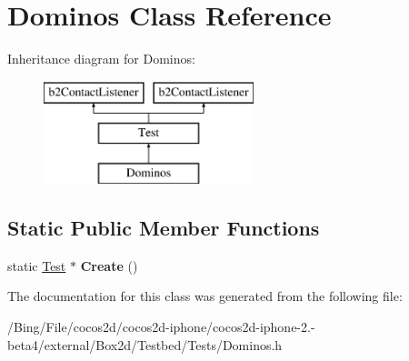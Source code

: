 \hypertarget{class_dominos}{\section{Dominos Class Reference}
\label{class_dominos}
}
Inheritance diagram for Dominos\-:\begin{figure}[H]
\begin{center}
\leavevmode
\includegraphics[height=3.000000cm]{class_dominos}
\end{center}
\end{figure}
\subsection*{Static Public Member Functions}
\begin{DoxyCompactItemize}
\item 
\hypertarget{class_dominos_a804c1c471f0eff8529a84948120f0d1a}{static \hyperlink{class_test}{Test} $\ast$ {\bfseries Create} ()}\label{class_dominos_a804c1c471f0eff8529a84948120f0d1a}

\end{DoxyCompactItemize}


The documentation for this class was generated from the following file\-:\begin{DoxyCompactItemize}
\item 
/\-Bing/\-File/cocos2d/cocos2d-\/iphone/cocos2d-\/iphone-\/2.-\/beta4/external/\-Box2d/\-Testbed/\-Tests/Dominos.\-h\end{DoxyCompactItemize}
